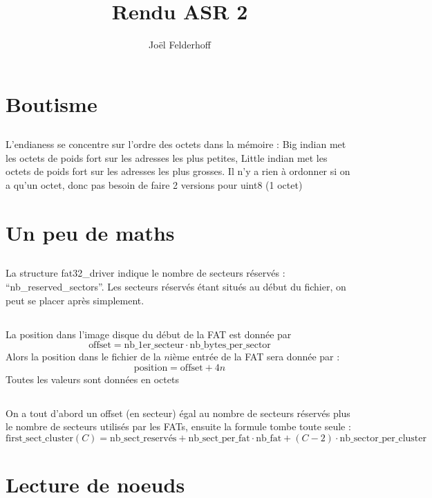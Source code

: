 \documentclass[11pt]{article} %
\title{Rendu ASR 2}
\author{Joël Felderhoff}
\begin{document}
\maketitle

\section{Boutisme}
\subsection{}
L'endianess se concentre sur l'ordre des octets dans la mémoire : Big indian met les octets de poids fort sur les adresses les plus petites, Little indian met les octets de poids fort sur les adresses les plus grosses. Il n'y a rien à ordonner si on a qu'un octet, donc pas besoin de faire 2 versions pour uint8 (1 octet)

\setcounter{section}{2}
\section{Un peu de maths}
\subsection{}
La structure fat32\_driver indique le nombre de secteurs réservés : ``nb\_reserved\_sectors''. Les secteurs réservés étant situés au début du fichier, on peut se placer après simplement.
\subsection{}
La position dans l'image disque du début de la FAT est donnée par 
$$\text{offset} = \text{nb\_1er\_secteur} \cdot \text{nb\_bytes\_per\_sector} $$
Alors la position dans le fichier de la $n$ième entrée de la FAT sera donnée par :
$$ \text{position} = \text{offset} + 4n$$
Toutes les valeurs sont données en octets
\setcounter{subsection}{3}
\subsection{}
On a tout d'abord un offset (en secteur) égal au nombre de secteurs réservés plus le nombre de secteurs utilisés par les FATs, ensuite la formule tombe toute seule :
$$
  \text{first\_sect\_cluster}(C) = \text{nb\_sect\_reservés} + \text{nb\_sect\_per\_fat} \cdot \text{nb\_fat} + (C-2) \cdot \text{nb\_sector\_per\_cluster}
$$

\section{Lecture de noeuds}
\end{document}

